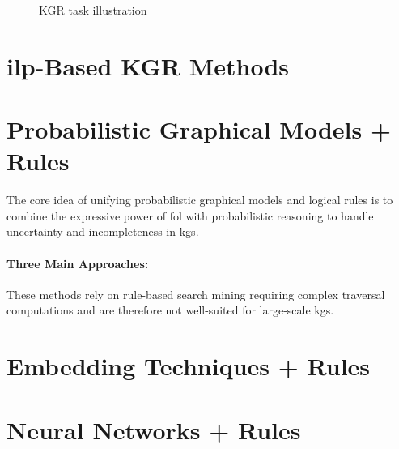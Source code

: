 

\begin{figure}[H]
    \caption{KGR task illustration}\label{fig:figure3}
\end{figure}


\section{\gls{ilp}-Based KGR Methods}\label{sec:ilp-based-kgr-methods}






\section{Probabilistic Graphical Models + Rules}\label{sec:probabilistic-graphical-models-+-rules}

The core idea of unifying probabilistic graphical models and logical rules is to combine the expressive power of \gls{fol}
with probabilistic reasoning to handle
uncertainty and incompleteness in \glspl{kg}.

\paragraph{Three Main Approaches:}

\begin{challenge}
    These methods rely on rule-based search mining requiring complex traversal
    computations and are therefore not well-suited for large-scale \glspl{kg}.
\end{challenge}



\section{Embedding Techniques + Rules}\label{sec:embedding-techniques-rules}



\section{Neural Networks + Rules}\label{sec:neural-networks-rules}

